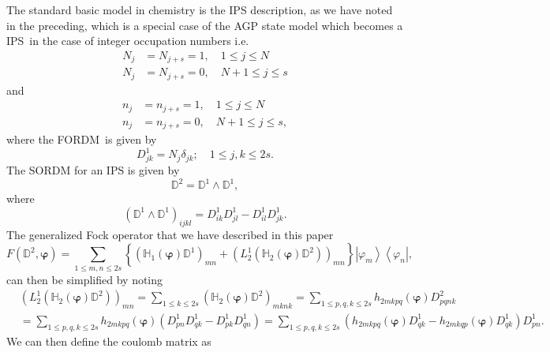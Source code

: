 \documentclass[aps,preprint]{revtex4}%
\begin{document}
The standard basic model in chemistry is the IPS description, as we have noted
in the preceding, which is a special case of the AGP state model which becomes
a IPS\ in the case of integer occupation numbers i.e.
\begin{align}
N_{j}  &  =N_{j+s}=1,\quad1\leq j\leq N\nonumber\\
N_{j}  &  =N_{j+s}=0,\quad N+1\leq j\leq s
\end{align}
and%
\begin{align}
n_{j}  &  =n_{j+s}=1,\quad1\leq j\leq N\nonumber\\
n_{j}  &  =n_{j+s}=0,\quad N+1\leq j\leq s,
\end{align}
where the FORDM\ is given by
\begin{equation}
D_{jk}^{1}=N_{j}\delta_{jk};\quad1\leq j,k\leq2s.
\end{equation}
The SORDM for an IPS is given by
\begin{equation}
\mathbb{D}^{2}=\mathbb{D}^{1}\wedge\mathbb{D}^{1},
\end{equation}
where
\begin{equation}
\left(  \mathbb{D}^{1}\wedge\mathbb{D}^{1}\right)  _{ijkl}=D_{ik}^{1}%
D_{jl}^{1}-D_{il}^{1}D_{jk}^{1}.
\end{equation}
The generalized Fock operator that we have described in this paper
\begin{equation}
F\left(  \mathbb{D}^{2},\bm{\varphi}\right)  =\sum_{1\leq m,n\leq2s}\left\{
\left(  \mathbb{H}_{1}\left(  \bm{\varphi}\right)  \mathbb{D}^{1}\right)
_{mn}+\left(  L_{2}^{1}\left(  \mathbb{H}_{2}\left(  \bm{\varphi}\right)
\mathbb{D}^{2}\right)  \right)  _{mn}\right\}  \left\vert \varphi
_{m}\right\rangle \left\langle \varphi_{n}\right\vert , \label{F1}%
\end{equation}
can then be simplified by noting
\begin{align}
&  \left(  L_{2}^{1}\left(  \mathbb{H}_{2}\left(  \bm{\varphi}\right)
\mathbb{D}^{2}\right)  \right)  _{mn}=\sum_{1\leq k\leq2s}\left(
\mathbb{H}_{2}\left(  \bm{\varphi}\right)  \mathbb{D}^{2}\right)  _{mknk}%
=\sum_{1\leq p,q,k\leq2s}h_{2mkpq}\left(  \bm{\varphi}\right)  D_{pqnk}%
^{2}\nonumber\\
&  =\sum_{1\leq p,q,k\leq2s}h_{2mkpq}\left(  \bm{\varphi}\right)  \left(
D_{pn}^{1}D_{qk}^{1}-D_{pk}^{1}D_{qn}^{1}\right)  =\sum_{1\leq p,q,k\leq
2s}\left(  h_{2mkpq}\left(  \bm{\varphi}\right)  D_{qk}^{1}-h_{2mkqp}\left(
\bm{\varphi}\right)  D_{qk}^{1}\right)  D_{pn}^{1}.
\end{align}
We can then define the coulomb matrix as
\end{document}
